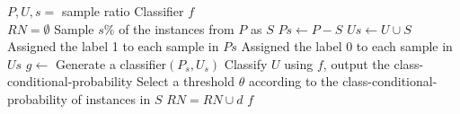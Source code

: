\documentclass{article}
\begin{document}
\begin{algorithm}[!h]
\renewcommand{\algorithmicrequire}{\textbf{Input:}} %
\renewcommand{\algorithmicensure}{\textbf{Output:}} %
	\caption{POSTER} %
	\begin{algorithmic}[1] %
	    \REQUIRE
	    $P,U,s=$ sample ratio
	    \ENSURE
	    Classifier $f$ \\
	    \STATE $RN=\emptyset$
	    \STATE Sample $s\%$ of the instances from $P$ as $S$
		\STATE $Ps\leftarrow P-S$
		\STATE $Us\leftarrow U\cup S$
		\STATE Assigned the label 1 to each sample in $Ps$
		\STATE Assigned the label 0 to each sample in $Us$
		\STATE $g\leftarrow$ Generate a classifier$(P_s,U_s)$
		\STATE Classify $U$ using $f$, output the class-conditional-probability
		\STATE Select a threshold $\theta$ according to the class-conditional-probability of instances in $S$
		\STATE $RN=RN\cup d$
		\ENDIF
		\ENDFOR
		\RETURN $f$
	\end{algorithmic}
\end{algorithm}
\end{document}
